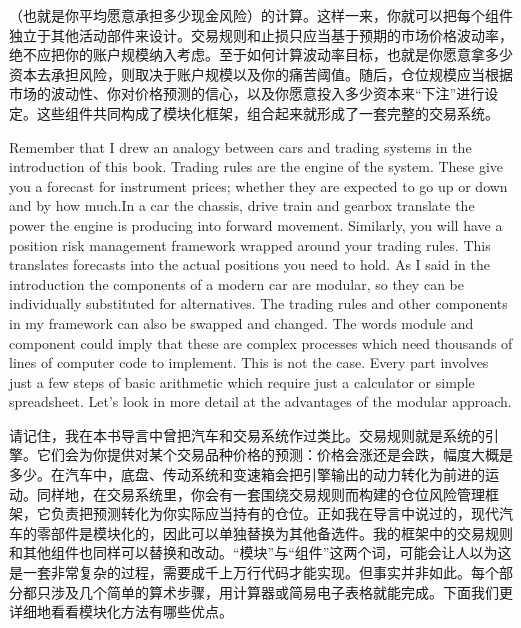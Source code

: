 \begin{chineseblock}（也就是你平均愿意承担多少现金风险）的计算。这样一来，你就可以把每个组件独立于其他活动部件来设计。交易规则和止损只应当基于预期的市场价格波动率，绝不应把你的账户规模纳入考虑。至于如何计算波动率目标，也就是你愿意拿多少资本去承担风险，则取决于账户规模以及你的痛苦阈值。随后，仓位规模应当根据市场的波动性、你对价格预测的信心，以及你愿意投入多少资本来“下注”进行设定。这些组件共同构成了模块化框架，组合起来就形成了一套完整的交易系统。\end{chineseblock}


\begin{englishblock} Remember that I drew an analogy between cars and trading systems in the introduction of this book. Trading rules are the engine of the system. These give you a forecast for instrument prices; whether they are expected to go up or down and by how much.In a car the chassis, drive train and gearbox translate the power the engine is producing into forward movement. Similarly, you will have a position risk management framework wrapped around your trading rules. This translates forecasts into the actual positions you need to hold. As I said in the introduction the components of a modern car are modular, so they can be individually substituted for alternatives. The trading rules and other components in my framework can also be swapped and changed. The words module and component could imply that these are complex processes which need thousands of lines of computer code to implement. This is not the case. Every part involves just a few steps of basic arithmetic which require just a calculator or simple spreadsheet. Let's look in more detail at the advantages of the modular approach. \end{englishblock}

\begin{chineseblock}请记住，我在本书导言中曾把汽车和交易系统作过类比。交易规则就是系统的引擎。它们会为你提供对某个交易品种价格的预测：价格会涨还是会跌，幅度大概是多少。在汽车中，底盘、传动系统和变速箱会把引擎输出的动力转化为前进的运动。同样地，在交易系统里，你会有一套围绕交易规则而构建的仓位风险管理框架，它负责把预测转化为你实际应当持有的仓位。正如我在导言中说过的，现代汽车的零部件是模块化的，因此可以单独替换为其他备选件。我的框架中的交易规则和其他组件也同样可以替换和改动。“模块”与“组件”这两个词，可能会让人以为这是一套非常复杂的过程，需要成千上万行代码才能实现。但事实并非如此。每个部分都只涉及几个简单的算术步骤，用计算器或简易电子表格就能完成。下面我们更详细地看看模块化方法有哪些优点。\end{chineseblock}

